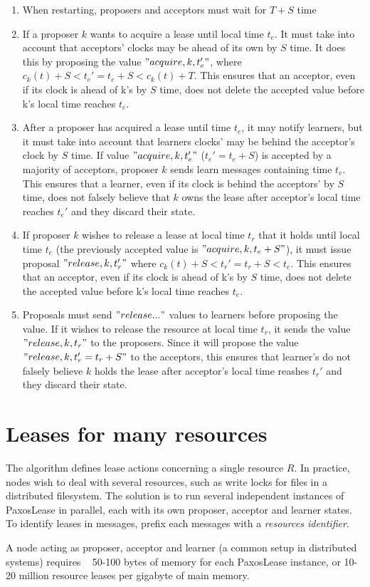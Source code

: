 \documentclass[12pt]{amsart}
\begin{document}
\begin{enumerate}

\item When restarting, proposers and acceptors must wait for $T + S$ time

\item If a proposer $k$ wants to acquire a lease until local time $t_e$. It must take into account that acceptors' clocks may be ahead of its own by $S$ time. It does this by proposing the value $"acquire, k, t_e'"$, where $c_k(t) + S < t_e' = t_e + S < c_k(t) + T$. This ensures that an acceptor, even if its clock is ahead of k's by $S$ time, does not delete the accepted value before k's local time reaches $t_e$.
 
\item After a proposer has acquired a lease until time $t_e$, it may notify learners, but it must take into account that learners clocks' may be behind the acceptor's clock by $S$ time. If value $"acquire, k, t_e'"$ ($t_e' = t_e + S$) is accepted by a majority of acceptors, proposer $k$ sends learn messages containing time $t_e$. This ensures that a learner, even if its clock is behind the acceptors' by $S$ time, does not falsely believe that $k$ owns the lease after acceptor's local time reaches $t_e'$ and they discard their state.

\item If proposer $k$ wishes to release a lease at local time $t_r$ that it holds until local time $t_e$ (the previously accepted value is $"acquire, k, t_e + S"$), it must issue proposal $"release, k, t_r'"$ where $c_k(t) + S < t_r' = t_r + S < t_e$. This ensures that an acceptor, even if its clock is ahead of k's by $S$ time, does not delete the accepted value before k's local time reaches $t_e$.

\item Proposals must send $"release..."$ values to learners before proposing the value. If it wishes to release the resource at local time $t_r$, it sends the value $"release, k, t_r"$ to the proposers. Since it will propose the value $"release, k, t_r' = t_r + S"$ to the acceptors, this ensures that learner's do not falsely believe $k$ holds the lease after acceptor's local time reashes $t_r'$ and they discard their state.

\end{enumerate}


\section{ Leases for many resources }

The algorithm defines lease actions concerning a single resource $R$. In practice, nodes wish to deal with several resources, such as write locks for files in a distributed filesystem. The solution is to run several independent instances of PaxosLease in parallel, each with its own proposer, acceptor and learner states. To identify leases in messages, prefix each messages with a \emph{resources identifier}.

A node acting as proposer, acceptor and learner (a common setup in distributed systems) requires ~ 50-100 bytes of memory for each PaxosLease instance, or 10-20 million resource leases per gigabyte of main memory.
\end{document}
